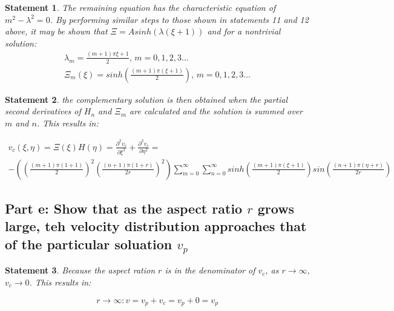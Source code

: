 \documentclass[10pt, reqno]{amsart}
\newtheorem{mydef}{Statement}
\begin{document}
\begin{mydef}
The remaining equation has the characteristic equation of $m^2-\lambda^2=0 $.  By performing similar steps to those shown in statements 11 and 12 above, it may be shown that $\Xi = Asinh(\lambda(\xi+1))$ and for a nontrivial solution:
\begin{gather}
\lambda_m = \frac{(m+1)\pi{\xi+1}}{2}, \, m=0,1,2,3...\\
\Xi_m(\xi) = sinh\left( \frac{(m+1)\pi(\xi+1)}{2} \right), \, m = 0,1,2,3...
\end{gather}
\end{mydef}

\begin{mydef}
the complementary solution is then obtained when the partial second derivatives of $H_n$ and $\Xi_m$ are calculated and the solution is summed over $m$ and $n$.  This results in:

\begin{gather*}
v_c \left( \xi,\eta \right) = \Xi \left( \xi \right) H \left( \eta \right)=
\frac{\partial^2 v_c}{\partial \xi^2}+\frac{\partial^2 v_c}{\partial \eta^2} =\\ 
-\left( \left(\frac{(m+1)\pi(1+1)}{2}\right)^2 \left( \frac{(n+1)\pi(1+r)}{2r} \right)^2 \right)
\sum\limits_{m=0}^\infty \sum\limits_{n=0}^\infty
sinh\left( \frac{(m+1)\pi(\xi+1)}{2} \right)
sin\left(\frac{(n+1)\pi(\eta+r)}{2r}\right)
\end{gather*}
\end{mydef}

\subsection{Part e: Show that as the aspect ratio $r$ grows large, teh velocity distribution approaches that of the particular soluation $v_p$}

\begin{mydef}
Because the aspect ration $r$ is in the denominator of $v_c$, as $r \rightarrow \infty$, $v_c \rightarrow 0$.  This results in:

\begin{equation}
r \rightarrow \infty: v=v_p + v_c = v_p + 0 = v_p
\end{equation}

\end{mydef}
\end{document}
